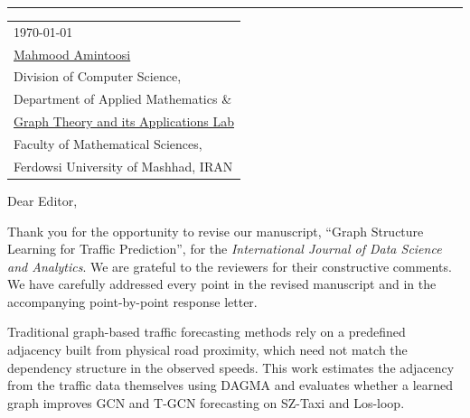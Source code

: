 \documentclass[10pt]{article}
\begin{document}


\vspace{-1em} %

\rule{\linewidth}{1pt} %

\bigskip\bigskip %


\hfill
\begin{tabular}{l @{}}
	\today \bigskip\\ %
\href{https://mamintoosi.github.io/}{Mahmood Amintoosi}\\
Division of Computer Science,\\
Department of Applied Mathematics \&\\
\href{https://gta-lab.github.io/}{Graph Theory and its Applications Lab} \\
Faculty of Mathematical Sciences,\\ Ferdowsi University of Mashhad,
IRAN
\end{tabular}

\bigskip %

Dear Editor,

\bigskip %


Thank you for the opportunity to revise our manuscript, ``Graph Structure Learning for Traffic Prediction'', for the \textit{International Journal of Data Science and Analytics}. We are grateful to the reviewers for their constructive comments. We have carefully addressed every point in the revised manuscript and in the accompanying point-by-point response letter.

Traditional graph-based traffic forecasting methods rely on a predefined adjacency built from physical road proximity, which need not match the dependency structure in the observed speeds. This work estimates the adjacency from the traffic data themselves using DAGMA and evaluates whether a learned graph improves GCN and T-GCN forecasting on SZ-Taxi and Los-loop.
\end{document}
